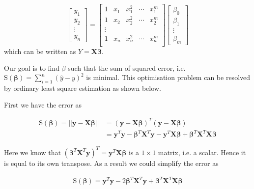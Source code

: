 $$
\begin{bmatrix}
y_1 \\ y_2\\ \vdots \\ y_n 
\end{bmatrix}=\begin{bmatrix}
1 & x_1 & x_1^2 &\cdots & x_1^m \\ 
1 & x_2 & x_2^2 &\cdots & x_2^m \\ 
\vdots \\ 
1 & x_n & x_n^2 &\cdots & x_n^m \\ 
\end{bmatrix}\begin{bmatrix}
\beta_0 \\ \beta_1 \\ \vdots \\ \beta_m 
\end{bmatrix}
$$ which can be written as $Y=\boldsymbol{X}\boldsymbol{\beta}$. 
 
 Our goal is to find $\beta$ such that the sum of squared error, i.e. $\text{S}(\boldsymbol{\beta})=\sum_{i=1}^n(\hat{y}-y)^2$ is minimal. This optimisation problem can be resolved by ordinary least square estimation as shown below.
 
 First we have the error as
 
 \begin{equation}
 \begin{split}
 \text{S}(\boldsymbol{\beta})=||\boldsymbol{y}-\boldsymbol{X} \boldsymbol{\beta}||& =(\boldsymbol{y}-\boldsymbol{X}\boldsymbol{\beta})^T(\boldsymbol{y}-\boldsymbol{X}\boldsymbol{\beta})\\
 	& =\boldsymbol{y}^T\boldsymbol{y}-\boldsymbol{\beta}^T\boldsymbol{X}^T\boldsymbol{y}-\boldsymbol{y}^T\boldsymbol{X}\boldsymbol{\beta}+\boldsymbol{\beta}^T\boldsymbol{X}^T\boldsymbol{X}\boldsymbol{\beta}
\end{split}
 \end{equation}
 
 Here we know that $(\boldsymbol{\beta}^T\boldsymbol{X}^T\boldsymbol{y})^T=\boldsymbol{y}^T\boldsymbol{X}\boldsymbol{\beta}$ is a $1\times 1$ matrix, i.e. a scalar. Hence it is equal to its own transpose. As a result we could simplify the error as
 
 \begin{equation}
 	\begin{split}
 		\text{S}(\boldsymbol{\beta})=\boldsymbol{y}^T\boldsymbol{y}-2\boldsymbol{\beta}^T\boldsymbol{X}^T\boldsymbol{y}+\boldsymbol{\beta}^T\boldsymbol{X}^T\boldsymbol{X}\boldsymbol{\beta}
 	\end{split}
 \end{equation}
 
